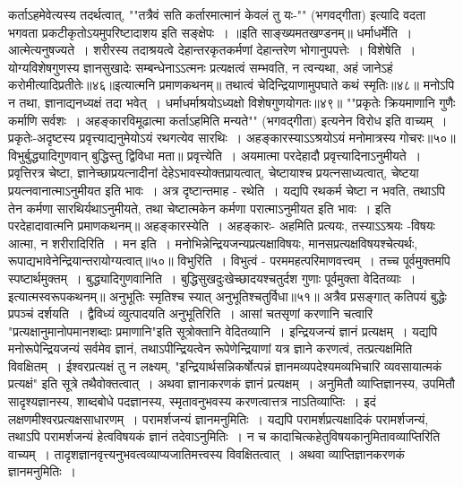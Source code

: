 कर्ताऽहमेवेत्यस्य तदर्थत्वात्,
""तत्रैवं सति कर्तारमात्मानं केवलं तु यः-"" (भगवद्गीता) इत्यादि वदता भगवता प्रकटीकृतोऽयमुपरिष्टादाशय इति सङ्क्षेपः~।
॥इति साङ्ख्यमतखण्डनम्॥
धर्माधर्मेति~। आत्मेत्यनुषज्यते~। शरीरस्य तदाश्रयत्वे देहान्तरकृतकर्मणां देहान्तरेण भोगानुपपत्तेः~। विशेषेति~। योग्यविशेषगुणस्य ज्ञानसुखादेः सम्बन्धेनाऽऽत्मनः
प्रत्यक्षत्वं सम्भवति, न त्वन्यथा, अहं जानेऽहं करोमीत्यादिप्रतीतेः॥४६॥इत्यात्मनि प्रमाणकथनम्॥
तथात्वं चेदिन्द्रियाणामुपघाते कथं स्मृतिः॥४८॥
मनोऽपि न तथा, ज्ञानाद्यनध्यक्षं तदा भवेत्~।
धर्माधर्माश्रयोऽध्यक्षो विशेषगुणयोगतः॥४९॥
""प्रकृतेः क्रियमाणानि गुणैः कर्माणि सर्वशः~।
अहङ्कारविमूढात्मा कर्ताऽहमिति मन्यते"" (भगवद्गीता)
इत्यनेन विरोध इति वाच्यम्~। प्रकृतेः-अदृष्टस्य
प्रवृत्त्याद्यनुमेयोऽयं रथगत्येव सारथिः~।
अहङ्कारस्याऽऽश्रयोऽयं मनोमात्रस्य गोचरः॥५०॥
विभुर्बुद्ध्यादिगुणवान् बुद्धिस्तु द्विविधा मता॥
प्रवृत्त्येति~। अयमात्मा परदेहादौ प्रवृत्त्यादिनाऽनुमीयते~। प्रवृत्तिरत्र चेष्टा, ज्ञानेच्छाप्रयत्नादीनां देहेऽभावस्योक्तप्रायत्वात्, चेष्टायाश्च प्रयत्नसाध्यत्वात्, चेष्टया
प्रयत्नवानात्माऽनुमीयत इति भावः~।
अत्र दृष्टान्तमाह - रथेति~। यद्यपि रथकर्म चेष्टा न भवति, तथाऽपि तेन कर्मणा सारथिर्यथाऽनुमीयते, तथा चेष्टात्मकेन कर्मणा परात्माऽनुमीयत इति भावः~।
इति परदेहादावात्मनि प्रमाणकथनम्॥
अहङ्कारस्येति~। अहङ्कारः- अहमिति प्रत्ययः, तस्याऽऽश्रयः -विषयः आत्मा, न शरीरादिरिति~।
मन इति~। मनोभिन्नेन्द्रियजन्यप्रत्यक्षाविषयः, मानसप्रत्यक्षविषयश्चेत्यर्थः, रूपाद्यभावेनेन्द्रियान्तरायोग्यत्वात्॥५०॥
विभुरिति~। विभुत्वं - परममहत्परिमाणवत्त्वम्~। तच्च पूर्वमुक्तमपि स्पष्टार्थमुक्तम्~। बुद्ध्यादिगुणवानिति~। बुद्धिसुखदुःखेच्छादयश्चतुर्दश गुणाः पूर्वमुक्ता वेदितव्याः~।
इत्यात्मस्वरूपकथनम्॥
अनुभूतिः स्मृतिश्च स्यात् अनुभूतिश्चतुर्विधा॥५१॥
अत्रैव प्रसङ्गात् कतिपयं बुद्धेः प्रपञ्चं दर्शयति~। द्वैविध्यं व्युत्पादयति अनुभूतिरिति~। आसां चतसृणां करणानि चत्वारि "प्रत्यक्षानुमानोपमानशब्दाः प्रमाणानि"इति
सूत्रोक्तानि वेदितव्यानि~। इन्द्रियजन्यं ज्ञानं प्रत्यक्षम्~। यद्यपि मनोरूपेन्द्रियजन्यं सर्वमेव ज्ञानं, तथाऽपीन्द्रियत्वेन रूपेणेन्द्रियाणां यत्र ज्ञाने करणत्वं, तत्प्रत्यक्षमिति
विवक्षितम्~। ईश्वरप्रत्यक्षं तु न लक्ष्यम्, "इन्द्रियार्थसन्निकर्षोत्पन्नं ज्ञानमव्यपदेश्यमव्यभिचारि व्यवसायात्मकं प्रत्यक्षं" इति सूत्रे तथैवोक्तत्वात्~।
अथवा ज्ञानाकरणकं ज्ञानं प्रत्यक्षम्~। अनुमितौ व्याप्तिज्ञानस्य, उपमितौ सादृश्यज्ञानस्य, शाब्दबोधे पदज्ञानस्य, स्मृतावनुभवस्य करणत्वात्तत्र नाऽतिव्याप्तिः~। इदं
लक्षणमीश्वरप्रत्यक्षसाधारणम्~। परामर्शजन्यं ज्ञानमनुमितिः~। यद्यपि परामर्शप्रत्यक्षादिकं परामर्शजन्यं, तथाऽपि परामर्शजन्यं हेत्वविषयकं ज्ञानं तदेवाऽनुमितिः~। न च
कादाचित्कहेतुविषयकानुमितावव्याप्तिरिति वाच्यम्~। तादृशज्ञानवृत्त्यनुभवत्वव्याप्यजातिमत्त्वस्य विवक्षितत्वात्~।
अथवा व्याप्तिज्ञानकरणकं ज्ञानमनुमितिः~।
